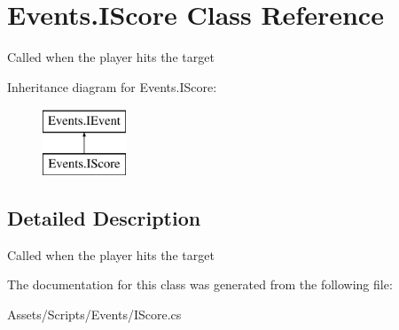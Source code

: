 \hypertarget{class_events_1_1_i_score}{}\section{Events.\+I\+Score Class Reference}
\label{class_events_1_1_i_score}


Called when the player hits the target  


Inheritance diagram for Events.\+I\+Score\+:\begin{figure}[H]
\begin{center}
\leavevmode
\includegraphics[height=2.000000cm]{class_events_1_1_i_score}
\end{center}
\end{figure}


\subsection{Detailed Description}
Called when the player hits the target 



The documentation for this class was generated from the following file\+:\begin{DoxyCompactItemize}
\item 
Assets/\+Scripts/\+Events/I\+Score.\+cs\end{DoxyCompactItemize}
